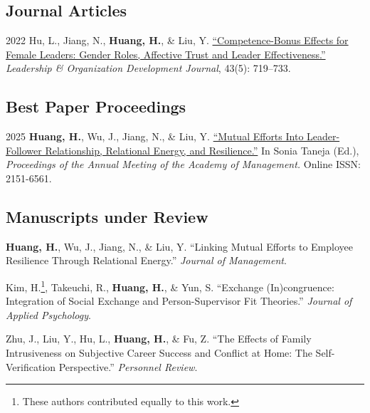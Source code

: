 \documentclass[12pt,letterpaper]{report} %
\begin{document}
    \subsection*{Journal Articles}

    \begin{tablist}

        \item[2022]\tab{}Hu, L., Jiang, N., \textbf{Huang, H.}, \& Liu, Y. \href{https://doi.org/10.1108/LODJ-06-2021-0312}{\enquote{Competence-Bonus Effects for Female Leaders: Gender Roles, Affective Trust and Leader Effectiveness.}} \textit{Leadership \& Organization Development Journal}, 43(5): 719--733. 

    \end{tablist}


    \subsection*{Best Paper Proceedings}

    \begin{tablist}
        \item[2025]\tab{}\textbf{Huang, H.}, Wu, J., Jiang, N., \& Liu, Y. \href{https://journals.aom.org/doi/abs/10.5465/AMPROC.2025.60bp}{\enquote{Mutual Efforts Into Leader-Follower Relationship, Relational Energy, and Resilience.}} In Sonia Taneja (Ed.), \textit{Proceedings of the  Annual Meeting of the Academy of Management.} Online ISSN: 2151-6561.
        

    \end{tablist}

    \subsection*{Manuscripts under Review}
    \begin{tablist}


        \item[]\tab{}\textbf{Huang, H.}, Wu, J., Jiang, N., \& Liu, Y. \enquote{Linking Mutual Efforts to Employee Resilience Through Relational Energy.} \textit{Journal of Management}.
        
        \item[]\tab{}Kim, H.\footnote{\label{fn:eqauth}These authors contributed equally to this work.}, Takeuchi, R., \textbf{Huang, H.}, \& Yun, S. \enquote{Exchange (In)congruence: Integration of Social Exchange and Person-Supervisor Fit Theories.} \textit{Journal of Applied Psychology}.

        \item[]\tab{}Zhu, J., Liu, Y., Hu, L., \textbf{Huang, H.}, \& Fu, Z. \enquote{The Effects of Family Intrusiveness on Subjective Career Success and Conflict at Home: The Self-Verification Perspective.} \textit{Personnel Review}.

    \end{tablist}
\end{document}
